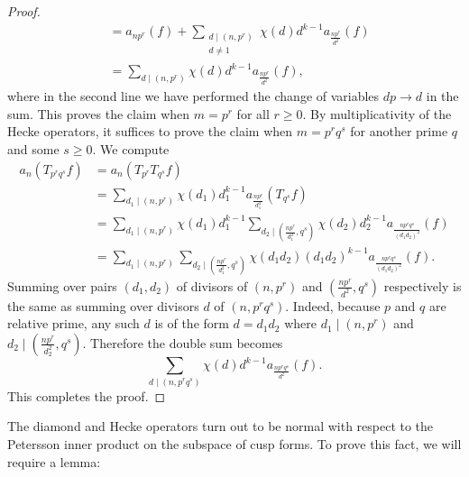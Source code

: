 \begin{proof}
\begin{align*}
        &= a_{np^{r}}(f)+\sum_{\substack{d \mid (n,p^{r}) \\ d \neq 1}}\chi(d)d^{k-1}a_{\frac{np^{r}}{d^{2}}}(f) \\
        &= \sum_{d \mid (n,p^{r})}\chi(d)d^{k-1}a_{\frac{np^{r}}{d^{2}}}(f),
      \end{align*}
      where in the second line we have performed the change of variables $dp \to d$ in the sum. This proves the claim when $m = p^{r}$ for all $r \ge 0$. By multiplicativity of the Hecke operators, it suffices to prove the claim when $m = p^{r}q^{s}$ for another prime $q$ and some $s \ge 0$. We compute
      \begin{align*}
        a_{n}(T_{p^{r}q^{s}}f) &= a_{n}(T_{p^{r}}T_{q^{s}}f) \\
        &= \sum_{d_{1} \mid (n,p^{r})}\chi(d_{1})d_{1}^{k-1}a_{\frac{np^{r}}{d_{1}^{2}}}(T_{q^{s}}f) \\
        &= \sum_{d_{1} \mid (n,p^{r})}\chi(d_{1})d_{1}^{k-1}\sum_{d_{2} \mid \left(\frac{np^{r}}{d_{1}^{2}},q^{s}\right)}\chi(d_{2})d_{2}^{k-1}a_{\frac{np^{r}q^{s}}{(d_{1}d_{2})^{2}}}(f) \\
        &= \sum_{d_{1} \mid (n,p^{r})}\sum_{d_{2} \mid \left(\frac{np^{r}}{d_{1}^{2}},q^{s}\right)}\chi(d_{1}d_{2})(d_{1}d_{2})^{k-1}a_{\frac{np^{r}q^{s}}{(d_{1}d_{2})^{2}}}(f).
      \end{align*}
      Summing over pairs $(d_{1},d_{2})$ of divisors of $(n,p^{r})$ and $\left(\frac{np^{r}}{d^{2}},q^{s}\right)$ respectively is the same as summing over divisors $d$ of $(n,p^{r}q^{s})$. Indeed, because $p$ and $q$ are relative prime, any such $d$ is of the form $d = d_{1}d_{2}$ where $d_{1} \mid (n,p^{r})$ and $d_{2} \mid \left(\frac{np^{r}}{d_{2}^{2}},q^{s}\right)$. Therefore the double sum becomes
      \[
        \sum_{d \mid (n,p^{r}q^{s})}\chi(d)d^{k-1}a_{\frac{np^{r}q^{s}}{d^{2}}}(f).
      \]
      This completes the proof.
    \end{proof}

    The diamond and Hecke operators turn out to be normal with respect to the Petersson inner product on the subspace of cusp forms. To prove this fact, we will require a lemma:

